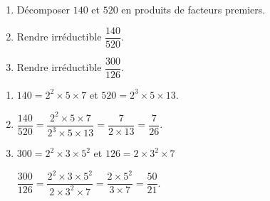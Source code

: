 \begin{exercice*}
    \begin{enumerate}
        \item Décomposer $140$ et $520$ en produits de facteurs premiers.
        \item Rendre irréductible $\dfrac{140}{520}$.
        \item Rendre irréductible $\dfrac{300}{126}$.
    \end{enumerate}
\end{exercice*}
\begin{corrige}
    \begin{enumerate}
        \item $140=2^2\times 5\times 7$ et $520=2^3\times 5\times 13$.
        \item $\dfrac{140}{520}=\dfrac{2^2\times 5\times 7}{2^3\times 5\times 13}=\dfrac{7}{2\times 13}=\dfrac{7}{26}$.
        \item $300=2^2\times 3\times 5^2$ et $126=2\times 3^2\times 7$        
        
        $\dfrac{300}{126}=\dfrac{2^2\times 3\times 5^2}{2\times 3^2\times 7}=\dfrac{2\times 5^2}{3\times 7}=\dfrac{50}{21}$.
    \end{enumerate}
\end{corrige}

